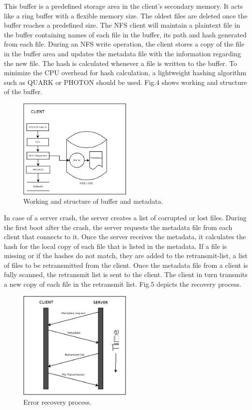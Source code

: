 \documentclass[conference]{IEEEtran}
\begin{document}
This buffer is a predefined storage area in the client's secondary memory.
It acts like a ring buffer with a flexible memory size. The oldest files are
deleted once the buffer reaches a predefined size. The NFS client will
maintain a plaintext file in the buffer containing names of each file in the
buffer, its path and hash generated from each file. During an NFS write
operation, the client stores a copy of the file in the buffer area and
updates the metadata file with the information regarding the  new file. The
hash is calculated whenever a file is written to the buffer. To minimize the
CPU overhead for hash calculation, a lightweight hashing algorithm such as
QUARK\cite{b4} or PHOTON\cite{b5} should be used. Fig.4 shows working and structure of the
buffer.
\begin{figure}[htbp]
\centerline{\includegraphics[width=0.5\textwidth,natwidth=400,natheight=50]{fixing_server_async.png}}
\caption{Working and structure of buffer and metadata.}
\label{fig}
\end{figure}
In case of a server crash, the server creates a list of corrupted or lost
files. During the first boot after the crash, the server requests the
metadata file from each client that connects to it. Once the server receives
the metadata, it calculates the hash for the local copy of each file that
is listed in the metadata. If a file is missing or if the hashes do not
match, they are added to the retransmit-list, a list of files to be 
retransmitted from the client. Once the metadata file from a client is fully
scanned, the retransmit list is sent to the client. The client in turn
transmits a new copy of each file in the retransmit list. Fig.5 depicts
the recovery process.
\begin{figure}[htbp]
\centerline{\includegraphics[width=0.5\textwidth,natwidth=400,natheight=50]{error_recovery.png}}
\caption{Error recovery process.}
\label{fig}
\end{figure}
\end{document}
